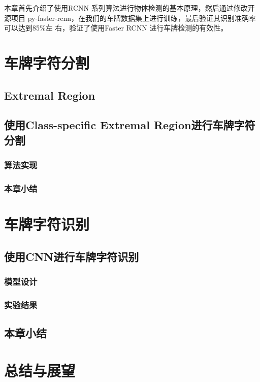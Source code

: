 本章首先介绍了使用RCNN 系列算法进行物体检测的基本原理，然后通过修改开源项目
py-faster-rcnn，在我们的车牌数据集上进行训练，最后验证其识别准确率可以达到85\%左
右，验证了使用Faster RCNN 进行车牌检测的有效性。

\chapter{车牌字符分割}

\section{Extremal Region}

\section{使用Class-specific Extremal Region进行车牌字符分割}

\subsection{算法实现}

\subsection{本章小结}

\chapter{车牌字符识别}

\section{使用CNN进行车牌字符识别}

\subsection{模型设计}

\subsection{实验结果}

\section{本章小结}

\chapter{总结与展望}

